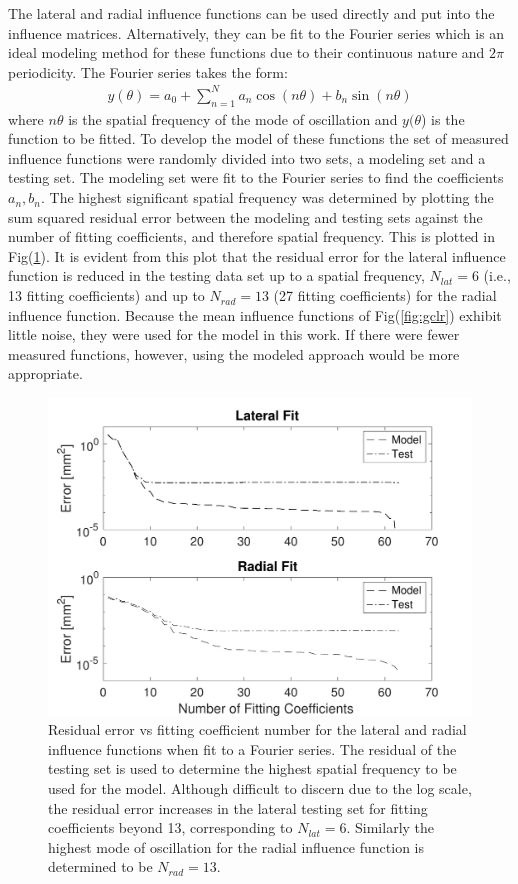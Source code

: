 \documentclass[journal]{IEEEtran}
\begin{document}
The lateral and radial influence functions can be used directly and put into the influence matrices.  Alternatively, they can be fit to the Fourier series which is an ideal modeling method for these functions due to their continuous nature and $2\pi$ periodicity.  The Fourier series takes the form:
\begin{align*}
y(\theta) =a_0 + \sum_{n=1}^{N} a_n\cos(n\theta) + b_n\sin(n\theta)
\end{align*}
where $n\theta$ is the spatial frequency of the mode of oscillation and $y(\theta$) is the function to be fitted.  To develop the model of these functions the set of measured influence functions were randomly divided into two sets, a modeling set and a testing set.  The modeling set were fit to the Fourier series to find the coefficients $a_n, b_n$.  The highest significant spatial frequency was determined by plotting the sum squared residual error between the modeling and testing sets against the number of fitting coefficients, and therefore spatial frequency. This is plotted in Fig(\ref{fig:Fourier}).  It is evident from this plot that the residual error for the lateral influence function is reduced in the testing data set up to a spatial frequency, $N_{lat} = 6$ (i.e., 13 fitting coefficients) and up to $N_{rad} = 13$ (27 fitting coefficients) for the radial influence function. Because the mean influence functions of Fig(\ref{fig:gclr}) exhibit little noise, they were used for the model in this work.  If there were fewer measured functions, however, using the modeled approach would be more appropriate. 

\begin{figure}[!t]
\centering
\includegraphics[width=3.25 in]{./figs/Fourier}
\caption{Residual error vs fitting coefficient number for the lateral and radial influence functions when fit to a Fourier series.  The residual of the testing set is used to determine the highest spatial frequency to be used for the model. Although difficult to discern due to the log scale, the residual error increases in the lateral testing set for fitting coefficients beyond 13, corresponding to $N_{lat}=6$.  Similarly the highest mode of oscillation for the radial influence function is determined to be $N_{rad} = 13$.}
\label{fig:Fourier}
\end{figure}
\end{document}
